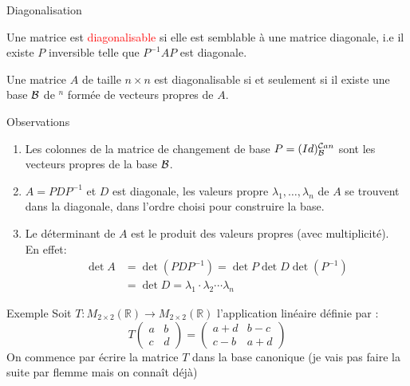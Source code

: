 \begin{parag}{Diagonalisation}
    \begin{definition}
        Une matrice est \textcolor{red}{diagonalisable} si elle est semblable à une matrice diagonale, i.e il existe $P$ inversible telle que $P^{-1}AP$ est diagonale.
    \end{definition}
    \begin{theoreme}
        Une matrice $A$ de taille $n \times n$ est diagonalisable si et seulement si il existe une base $\mathcal{B}$ de \R$^n$ formée de vecteurs propres de $A$.
        \end{theoreme}
        \begin{subparag}{Observations}
            \begin{enumerate}
                \item Les colonnes de la matrice de changement de base $P = (Id)_{\mathcal{B}}^{\mathcal{C} an}$ sont les vecteurs propres de la base $\mathcal{B}$.
                \item $A = PDP^{-1}$ et $D$ est diagonale, les valeurs propre $\lambda_1, \dots, \lambda_n$ de $A$ se trouvent dans la diagonale, dans l'ordre choisi pour construire la base.
                \item Le déterminant de $A$ est le produit des valeurs propres (avec multiplicité).\\ En effet:
                \begin{align*}
                    \det A &= \det (PDP^{-1}) = \det P \det D \det (P^{-1})\\
                    &= \det D = \lambda_1\cdot\lambda_2\cdots\lambda_n
                \end{align*}
            \end{enumerate}
        \end{subparag}
        \begin{subparag}{Exemple}
            Soit $T: M_{2\times 2}(\mathbb{R}) \to M_{2 \times 2}(\mathbb{R})$ l'application linéaire définie par : 
            \[T\begin{pmatrix}
                a & b \\ c & d
            \end{pmatrix} = \begin{pmatrix}
                a + d & b - c\\
                c -b & a + d
            \end{pmatrix}\]
            On commence par écrire la matrice $T$ dans la base canonique (je vais pas faire la suite par flemme mais on connaît déjà)
        \end{subparag}
\end{parag}
